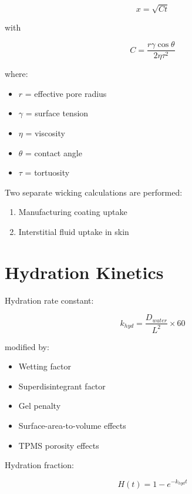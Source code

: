 \documentclass[11pt]{article}
\begin{document}
\begin{equation}
x=\sqrt{Ct}
\end{equation}

with

\begin{equation}
C=
\frac{r\gamma\cos\theta}
{2\eta\tau^2}
\end{equation}

where:

\begin{itemize}
\item $r$ = effective pore radius
\item $\gamma$ = surface tension
\item $\eta$ = viscosity
\item $\theta$ = contact angle
\item $\tau$ = tortuosity
\end{itemize}

Two separate wicking calculations are performed:

\begin{enumerate}
\item Manufacturing coating uptake
\item Interstitial fluid uptake in skin
\end{enumerate}

\section{Hydration Kinetics}

Hydration rate constant:

\begin{equation}
k_{hyd}
=
\frac{D_{water}}{L^2}
\times 60
\end{equation}

modified by:

\begin{itemize}
\item Wetting factor
\item Superdisintegrant factor
\item Gel penalty
\item Surface-area-to-volume effects
\item TPMS porosity effects
\end{itemize}

Hydration fraction:

\begin{equation}
H(t)=1-e^{-k_{hyd}t}
\end{equation}
\end{document}
